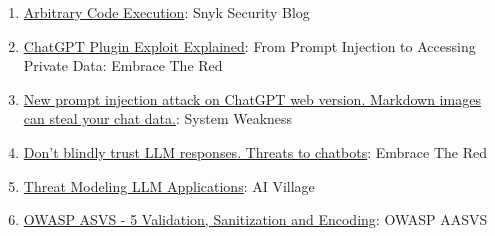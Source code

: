 \documentclass[
]{article}
\providecommand{\tightlist}{%
  \setlength{\itemsep}{0pt}\setlength{\parskip}{0pt}}
\begin{document}
\begin{enumerate}
\def\labelenumi{\arabic{enumi}.}
\tightlist
\item
  \href{https://security.snyk.io/vuln/SNYK-PYTHON-LANGCHAIN-5411357}{Arbitrary
  Code Execution}: Snyk Security Blog
\item
  \href{https://embracethered.com/blog/posts/2023/chatgpt-cross-plugin-request-forgery-and-prompt-injection./}{ChatGPT
  Plugin Exploit Explained}: From Prompt Injection to Accessing Private
  Data: Embrace The Red
\item
  \href{https://systemweakness.com/new-prompt-injection-attack-on-chatgpt-web-version-ef717492c5c2?gi=8daec85e2116}{New
  prompt injection attack on ChatGPT web version. Markdown images can
  steal your chat data.}: System Weakness
\item
  \href{https://embracethered.com/blog/posts/2023/ai-injections-threats-context-matters/}{Don't
  blindly trust LLM responses. Threats to chatbots}: Embrace The Red
\item
  \href{https://aivillage.org/large\%20language\%20models/threat-modeling-llm/}{Threat
  Modeling LLM Applications}: AI Village
\item
  \href{https://owasp-aasvs4.readthedocs.io/en/latest/V5.html\#validation-sanitization-and-encoding}{OWASP
  ASVS - 5 Validation, Sanitization and Encoding}: OWASP AASVS
\end{enumerate}
\end{document}
